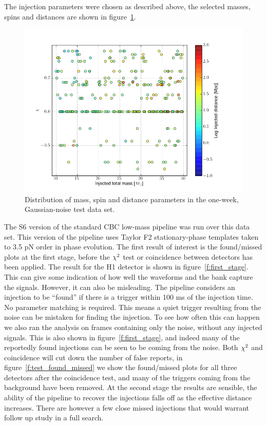 The injection parameters were chosen as described above, the selected
masses, spins and distances are shown in
figure~\ref{f:ninja2_test_dataset}.

\begin{figure}
  \includegraphics[width=\linewidth]{figures/ninja2_results/ninja2_test_dataset.png}
  \caption[Parameters of the NINJA-2 test one-week data set]{
  \label{f:ninja2_test_dataset}
Distribution of mass, spin and distance parameters in the one-week,
Gaussian-noise test data set.
}
\end{figure}%


The S6 version of the standard CBC low-mass pipeline was run over this
data set.  This version of the pipeline uses Taylor F2
stationary-phase templates taken to 3.5 pN order in phase evolution.
The first result of interest is the found/missed plots at the first
stage, before the $\chi^2$ test or coincidence between detectors has
been applied.  The result for the H1 detector is shown in
figure~\ref{f:first_stage}.  This can give some indication of how well
the waveforms and the bank capture the signals.  However, it can also
be misleading.  The pipeline considers an injection to be ``found'' if
there is a trigger within 100 ms of the injection time.  No parameter
matching is required.  This means a quiet trigger resulting from the
noise can be mistaken for finding the injection.  To see how often
this can happen we also ran the analysis on frames containing only the
noise, without any injected signals.  This is also shown in
figure~\ref{f:first_stage}, and indeed many of the reportedly found
injections can be seen to be coming from the noise.  Both $\chi^2$ and
coincidence will cut down the number of false reports, in
figure~\ref{f:test_found_missed} we show the found/missed plots for
all three detectors after the coincidence test, and many of the
triggers coming from the background have been removed.  At the second
stage the results are sensible, the ability of the pipeline to recover
the injections falls off as the effective distance increases.  There
are however a few close missed injections that would warrant follow up
study in a full search.


